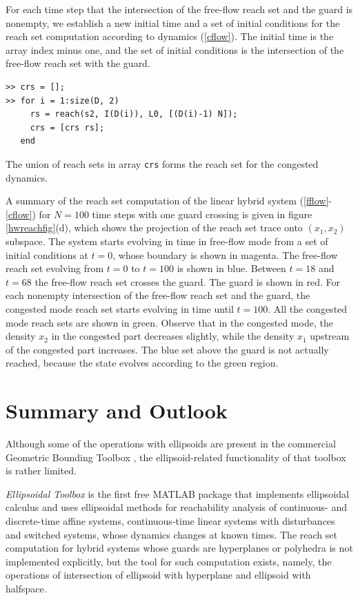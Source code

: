 \documentclass{report}
\begin{document}
For each time step that the intersection of the free-flow reach set and the
guard is nonempty, we establish a new initial time and a set of initial
conditions for the reach set computation according to dynamics (\ref{cflow}).
The initial time is the array index minus one, and the set of initial
conditions is the intersection of the free-flow reach set with the guard.
{\tt \begin{verbatim}
>> crs = [];
>> for i = 1:size(D, 2)
     rs = reach(s2, I(D(i)), L0, [(D(i)-1) N]);
     crs = [crs rs];
   end
\end{verbatim}}
The union of reach sets in array {\tt crs} forms the reach set for
the congested dynamics.

A summary of
 the reach set computation of the
linear hybrid system (\ref{fflow}-\ref{cflow}) for $N=100$ time steps
with one guard crossing is given in figure \ref{hwreachfig}(d),
which shows the projection of the reach set trace onto $(x_1,x_2)$ subspace.
The system starts evolving in time in free-flow mode from a set of
initial conditions at $t=0$, whose boundary is shown in magenta.
The free-flow reach set evolving from $t=0$ to $t=100$ is shown in blue.
Between  $t=18$ and $t=68$ the free-flow reach set crosses the guard.
The guard is shown in red.
For each  nonempty intersection of the free-flow reach set and the guard,
the congested mode reach set starts evolving in time until $t=100$.
All the congested mode reach sets are shown in green.
Observe that in the congested mode, the density $x_2$ in the congested part
 decreases slightly, while the density $x_1$ upstream of the congested part
 increases.
The blue  set above the guard is not actually reached,
because the state evolves according to the green region.





\chapter{Summary and Outlook}
Although some of the operations with ellipsoids are present in the
commercial Geometric Bounding Toolbox \cite{gbt1, gbt2}, the
ellipsoid-related functionality of that toolbox is rather limited.

{\it Ellipsoidal Toolbox} is the first free MATLAB package that
implements ellipsoidal calculus and uses ellipsoidal methods
for reachability analysis of continuous- and discrete-time affine
systems, continuous-time linear systems with disturbances and switched
systems, whose dynamics changes at known times.
The reach set computation for hybrid systems whose guards are hyperplanes
or polyhedra is not implemented explicitly, but the tool for such computation
exists, namely, the operations of intersection of ellipsoid with hyperplane
and ellipsoid with halfspace.
\end{document}
